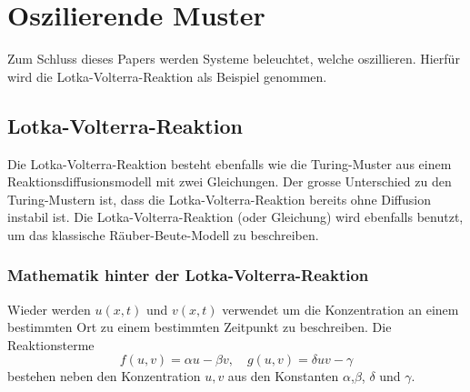 %
%
%
%
\section{Oszilierende Muster
\label{reaktdiff:section:teil2}}
Zum Schluss dieses Papers werden Systeme beleuchtet, welche oszillieren.
Hierfür wird die Lotka-Volterra-Reaktion als Beispiel genommen.


\subsection{Lotka-Volterra-Reaktion 
\label{reaktdiff:subsection:bonorum}}

Die Lotka-Volterra-Reaktion \cite{Wikipedia_LotkaVolterra_2025}  besteht ebenfalls wie die Turing-Muster aus einem Reaktionsdiffusionsmodell mit zwei Gleichungen.
%
Der grosse Unterschied zu den Turing-Mustern ist, dass die Lotka-Volterra-Reaktion bereits ohne Diffusion instabil ist.
Die Lotka-Volterra-Reaktion (oder Gleichung) wird ebenfalls benutzt, um das klassische Räuber-Beute-Modell zu beschreiben.
%

\subsubsection{Mathematik hinter der Lotka-Volterra-Reaktion}

Wieder werden \(u(x,t)\) und \(v(x,t)\) verwendet um die Konzentration an einem bestimmten Ort zu einem bestimmten Zeitpunkt zu beschreiben.
Die Reaktionsterme
\begin{equation}
     f(u,v) = \alpha u -  \beta v, \quad g(u,v)= \delta uv - \gamma
      \label{reaktdiff:equation:lvsys}
\end{equation}
bestehen neben den Konzentration \(u,v\) aus den Konstanten \(\alpha\),\(\beta\), \(\delta\) und \(\gamma\).

